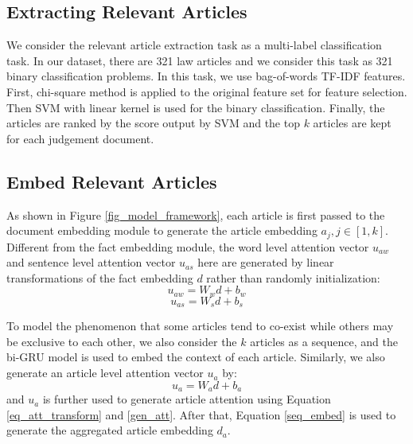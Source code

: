 \subsection{Extracting Relevant Articles}
\label{Extracting Relevant Articles}
We consider the relevant article extraction task as a multi-label classification task. In our dataset, there are 321 law articles and we consider this task as 321 binary classification problems. 
In this task, we use bag-of-words TF-IDF features. First, chi-square method is applied to the original feature set for feature selection. Then SVM with linear kernel is used for the binary classification. Finally, the articles are ranked by the score output by SVM and the top $k$ articles are kept for each judgement document.

\subsection{Embed Relevant Articles}
\label{Embed Relevant Articles}
As shown in Figure \ref{fig_model_framework}, each article is first passed to the document embedding module to generate the article embedding $a_j, j\in [1, k]$. Different from the fact embedding module, the word level attention vector $u_{aw}$ and sentence level attention vector $u_{as}$ here are generated by linear transformations of the fact embedding $d$ rather than randomly initialization:
\begin{equation}
u_{aw} = W_w d + b_w
\end{equation}
\begin{equation}
u_{as} = W_s d + b_s
\end{equation}

To model the phenomenon that some articles tend to co-exist while others may be exclusive to each other, we also consider the $k$ articles as a sequence, and the bi-GRU model is used to embed the context of each article. Similarly, we also generate an article level attention vector $u_{a}$ by:
\begin{equation}
u_a = W_a d + b_a
\end{equation}
and $u_a$ is further used to generate article attention using Equation \ref{eq_att_transform} and \ref{gen_att}. After that, Equation \ref{seq_embed} is used to generate the aggregated article embedding $d_a$. 

